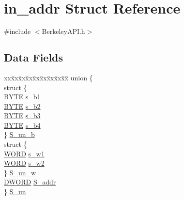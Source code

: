 \hypertarget{structin__addr}{}\section{in\+\_\+addr Struct Reference}
\label{structin__addr}


{\ttfamily \#include $<$Berkeley\+A\+P\+I.\+h$>$}

\subsection*{Data Fields}
\begin{DoxyCompactItemize}
\item 
\begin{tabbing}
xx\=xx\=xx\=xx\=xx\=xx\=xx\=xx\=xx\=\kill
union \{\\
\>struct \{\\
\>\>\hyperlink{_generic_type_defs_8h_a4ae1dab0fb4b072a66584546209e7d58}{BYTE} \hyperlink{structin__addr_ab8d7c45a86d97a372ccb41d6618f46f3}{s\_b1}\\
\>\>\hyperlink{_generic_type_defs_8h_a4ae1dab0fb4b072a66584546209e7d58}{BYTE} \hyperlink{structin__addr_a9606af179c8295653be9a1e255f5ca24}{s\_b2}\\
\>\>\hyperlink{_generic_type_defs_8h_a4ae1dab0fb4b072a66584546209e7d58}{BYTE} \hyperlink{structin__addr_af872852810d110496eeac3ca566bc153}{s\_b3}\\
\>\>\hyperlink{_generic_type_defs_8h_a4ae1dab0fb4b072a66584546209e7d58}{BYTE} \hyperlink{structin__addr_a864b1f42bfb2d68d244de10e8fd311bb}{s\_b4}\\
\>\} \hyperlink{structin__addr_ae0b2b1e7d716d219e36f174bb1d20dee}{S\_un\_b}\\
\>struct \{\\
\>\>\hyperlink{_generic_type_defs_8h_a2b0e863dadf920709ec53d9088ee7c91}{WORD} \hyperlink{structin__addr_a98e4022e8f9139a753a5a4756a356080}{s\_w1}\\
\>\>\hyperlink{_generic_type_defs_8h_a2b0e863dadf920709ec53d9088ee7c91}{WORD} \hyperlink{structin__addr_ae4fe55fa27939aa701135e5e0cf7fd31}{s\_w2}\\
\>\} \hyperlink{structin__addr_ade4ac89fd59c298981569985861345a2}{S\_un\_w}\\
\>\hyperlink{_generic_type_defs_8h_ad342ac907eb044443153a22f964bf0af}{DWORD} \hyperlink{structin__addr_aacb515a04e3508f1673b2c10b45df134}{S\_addr}\\
\} \hyperlink{structin__addr_ad42b4ed4012c0cba1e26a85e72e98248}{S\_un}\\

\end{tabbing}\end{DoxyCompactItemize}


